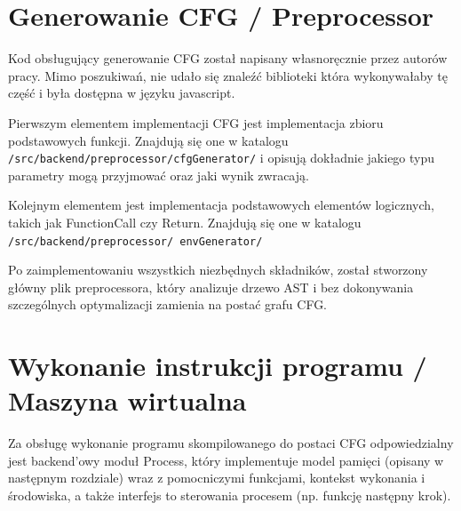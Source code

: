 \documentclass[a4paper,twoside,openright,11pt]{report}
\begin{document}
  \section {Generowanie CFG / Preprocessor}
	\par Kod obsługujący generowanie CFG został napisany własnoręcznie przez autorów pracy. Mimo poszukiwań, nie udało się znaleźć biblioteki która wykonywałaby tę część i była dostępna w języku javascript.
	\par Pierwszym elementem implementacji CFG jest implementacja zbioru podstawowych funkcji. Znajdują się one w katalogu \texttt{/src/backend/preprocessor/cfgGenerator/} i opisują dokładnie jakiego typu parametry mogą przyjmować oraz jaki wynik zwracają. 
	\par Kolejnym elementem jest implementacja podstawowych elementów logicznych, takich jak FunctionCall czy Return. Znajdują się one w katalogu \texttt{/src/backend/preprocessor/ envGenerator/}
	\par Po zaimplementowaniu wszystkich niezbędnych składników, został stworzony główny plik preprocessora, który analizuje drzewo AST i bez dokonywania szczególnych optymalizacji zamienia na postać grafu CFG.
	  
  \section {Wykonanie instrukcji programu / Maszyna wirtualna}
 	\par Za obsługę wykonanie programu skompilowanego do postaci CFG odpowiedzialny jest backend'owy moduł Process, który implementuje model pamięci (opisany w następnym rozdziale) wraz z pomocniczymi funkcjami, kontekst wykonania i środowiska, a także interfejs to sterowania procesem (np. funkcję następny krok).
\end{document}
